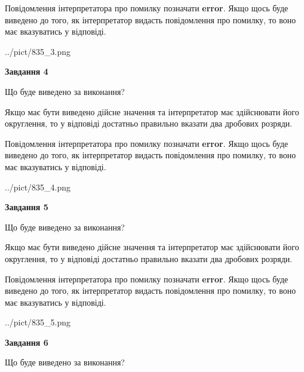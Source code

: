 \documentclass[12pt, ukrainian]{article}
\begin{document}
{\begin {Large}
Повідомлення інтерпретатора про помилку позначати \textbf{error}.
Якщо щось буде виведено до того, як інтерпретатор видасть повідомлення про помилку, 
то воно має вказуватись у відповіді. \par

\begin{center}
	{../pict/835_3.png}
\end{center}
\newpage

{\begin {center}\textbf{Завдання 4}\end {center}}\par
Що буде виведено за виконання? \par

Якщо має бути виведено дійсне значення та інтерпретатор має здійснювати його округлення, 
то у відповіді достатньо правильно вказати два дробових розряди.

Повідомлення інтерпретатора про помилку позначати \textbf{error}.
Якщо щось буде виведено до того, як інтерпретатор видасть повідомлення про помилку, 
то воно має вказуватись у відповіді. \par

\begin{center}
	{../pict/835_4.png}
\end{center}
\newpage

{\begin {center}\textbf{Завдання 5}\end {center}}\par
Що буде виведено за виконання? \par

Якщо має бути виведено дійсне значення та інтерпретатор має здійснювати його округлення, 
то у відповіді достатньо правильно вказати два дробових розряди.

Повідомлення інтерпретатора про помилку позначати \textbf{error}.
Якщо щось буде виведено до того, як інтерпретатор видасть повідомлення про помилку, 
то воно має вказуватись у відповіді. \par

\begin{center}
	{../pict/835_5.png}
\end{center}
\newpage

{\begin {center}\textbf{Завдання 6}\end {center}}\par
Що буде виведено за виконання? \par


\end{Large}}
\end{document}
